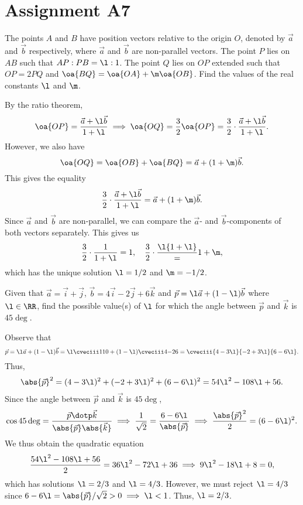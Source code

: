 \clearpage
\section{Assignment A7}

\begin{problem}
    The points $A$ and $B$ have position vectors relative to the origin $O$, denoted by $\vec a$ and $\vec b$ respectively, where $\vec a$ and $\vec b$ are non-parallel vectors. The point $P$ lies on $AB$ such that $AP : PB = \l : 1$. The point $Q$ lies on $OP$ extended such that $OP = 2PQ$ and $\oa{BQ} = \oa{OA} + \m \oa{OB}$. Find the values of the real constants $\l$ and $\m$.
\end{problem}
\begin{solution}
    By the ratio theorem, \[\oa{OP} = \frac{\vec a + \l \vec b}{1 + \l} \implies \oa{OQ} = \frac32 \oa{OP} = \frac32 \cdot \frac{\vec a + \l \vec b}{1 + \l}.\] However, we also have \[\oa{OQ} = \oa{OB} + \oa{BQ} = \vec a + (1 + \m) \vec b.\] This gives the equality \[\frac32 \cdot \frac{\vec a + \l \vec b}{1 + \l} = \vec a + (1 + \m) \vec b.\] Since $\vec a$ and $\vec b$ are non-parallel, we can compare the $\vec a$- and $\vec b$-components of both vectors separately. This gives us \[\frac32 \cdot \frac1{1 + \l} = 1, \quad \frac32 \cdot \frac\l{1 + \l} = 1 + \m,\] which has the unique solution $\l = 1/2$ and $\m = -1/2$.
\end{solution}

\begin{problem}
    Given that $\vec a = \vec i + \vec j$, $\vec b = 4 \vec i - 2 \vec j + 6 \vec k$ and $\vec p = \l \vec a + (1 - \l) \vec b$ where $\l \in \RR$, find the possible value(s) of $\l$ for which the angle between $\vec p$ and $\vec k$ is $45\deg$.
\end{problem}
\begin{solution}
    Observe that \[\vec p = \l \vec a + (1 - \l)\vec b = \l \cveciii110 + (1 - \l)\cveciii4{-2}6 = \cveciii{4 - 3 \l}{-2 + 3\l}{6 - 6\l}.\] Thus, \[\abs{\vec p}^2 = (4 - 3\l)^2 + (-2 + 3\l)^2 + (6 - 6\l)^2 = 54\l^2 - 108\l + 56.\] Since the angle between $\vec p$ and $\vec k$ is $45\deg$, \[\cos 45\deg = \frac{\vec p \dotp \vec k}{\abs{\vec p} \abs{\vec k}} \implies \frac1{\sqrt2} = \frac{6 - 6\l}{\abs{\vec p}} \implies \frac{\abs{\vec p}^2}{2} = (6 - 6\l)^2.\] We thus obtain the quadratic equation \[\frac{54\l^2 - 108\l + 56}2 = 36\l^2 - 72\l + 36 \implies 9\l^2 - 18\l + 8 = 0,\] which has solutions $\l = 2/3$ and $\l = 4/3$. However, we must reject $\l = 4/3$ since $6 - 6\l = \abs{\vec p}/\sqrt{2} > 0 \implies \l < 1$. Thus, $\l = 2/3$.
\end{solution}


